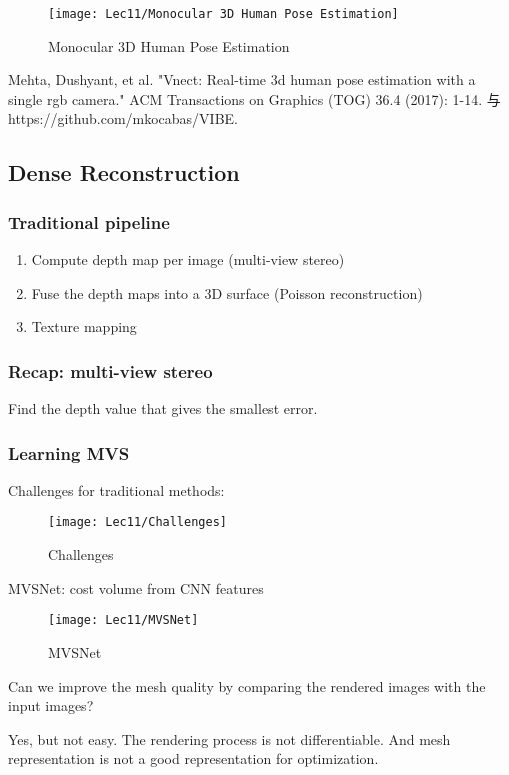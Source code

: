 \begin{figure}[H]
    \centering
    \texttt{[image: Lec11/Monocular 3D Human Pose Estimation]}
    \caption{Monocular 3D Human Pose Estimation}
\end{figure}

Mehta, Dushyant, et al. "Vnect: Real-time 3d human pose estimation with a single rgb camera."
ACM Transactions on Graphics (TOG) 36.4 (2017): 1-14. 与 https://github.com/mkocabas/VIBE. 

\subsection{Dense Reconstruction}

\subsubsection{Traditional pipeline}
\begin{enumerate}
    \item Compute depth map per image (multi-view stereo)
    \item Fuse the depth maps into a 3D surface (Poisson reconstruction)
    \item Texture mapping
\end{enumerate}

\subsubsection{Recap: multi-view stereo}
Find the depth value that gives the smallest error. 

\subsubsection{Learning MVS}
Challenges for traditional methods: 
\begin{figure}[H]
    \centering
    \texttt{[image: Lec11/Challenges]}
    \caption{Challenges}
\end{figure}

MVSNet: cost volume from CNN features
\begin{figure}[H]
    \centering
    \texttt{[image: Lec11/MVSNet]}
    \caption{MVSNet}
\end{figure}

Can we improve the mesh quality by comparing the rendered images with the input images?

Yes, but not easy. The rendering process is not differentiable. And mesh representation is not a good representation for optimization. 

